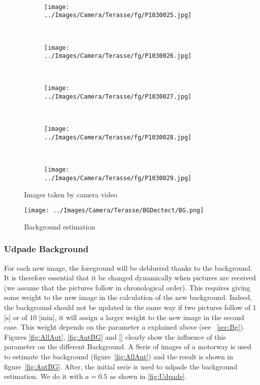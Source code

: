 \begin{figure}[h]
\begin{subfigure}{0.20\textwidth}
\caption{}
\label{fig:Ter11}
\end{subfigure}
~
\begin{subfigure}{0.20\textwidth}
\texttt{[image: ../Images/Camera/Terasse/fg/P1030025.jpg]}
\caption{}
\label{fig:Ter12}
\end{subfigure}
~
\begin{subfigure}{0.20\textwidth}
\texttt{[image: ../Images/Camera/Terasse/fg/P1030026.jpg]}
\caption{}
\label{fig:Ter13}
\end{subfigure}
~
\begin{subfigure}{0.20\textwidth}
\texttt{[image: ../Images/Camera/Terasse/fg/P1030027.jpg]}
\caption{}
\label{fig:Ter14}
\end{subfigure}
~
\begin{subfigure}{0.20\textwidth}
\texttt{[image: ../Images/Camera/Terasse/fg/P1030028.jpg]}
\caption{}
\label{fig:Ter15}
\end{subfigure}
~
\begin{subfigure}{0.20\textwidth}
\texttt{[image: ../Images/Camera/Terasse/fg/P1030029.jpg]}
\caption{}
\label{fig:Ter16}
\end{subfigure}
\caption{Images taken by camera video}
\label{fig:AllTer}
\end{figure}

\begin{figure}[h]
\centering
\texttt{[image: ../Images/Camera/Terasse/BGDectect/BG.png]}
\label{fig:TerBG}
\caption{Background estimation}
\end{figure} 

\subsubsection{Udpade Background}
\label{subsec:UdpadeBg}

For each new image, the foreground will be deblurred thanks to the background. It is therefore essential that it be changed dynamically when pictures are received (we assume that the pictures follow in chronological order). This requires giving some weight to the new image in the calculation of the new background. Indeed, the background should not be updated in the same way if two pictures follow of $1$ [s] or of $10$ [min], it will assign a larger weight to the new image in the second case. This weight depends on the parameter $a$ explained above (see ~\ref{sec:Bg}). Figures \ref{fig:AllAut}, \ref{fig:AutBG} and \ref{} clearly show the influence of this parameter on the different Background. A Serie of images of a motorway is used to estimate the background (figure~\ref{fig:AllAut}) and the result is shown in figure~\ref{fig:AutBG}. After, the initial serie is used to udpade the background estimation. We do it with $a=0.5$ as shown in \ref{fig:Udpade}.

